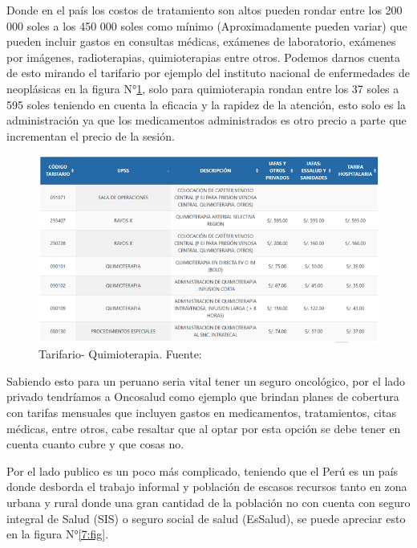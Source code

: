 Donde en el país los costos de tratamiento son altos pueden rondar entre los 200 000 soles a los 450 000 soles como mínimo (Aproximadamente pueden variar) que pueden incluir gastos en consultas médicas, exámenes de laboratorio, exámenes por imágenes, radioterapias, quimioterapias entre otros. Podemos darnos cuenta de esto mirando el tarifario por ejemplo del instituto nacional de enfermedades de neoplásicas en la figura N°\ref{6:fig}, solo para quimioterapia rondan entre los 37 soles a 595 soles teniendo en cuenta la eficacia y la rapidez de la atención, esto solo es la administración ya que los medicamentos administrados es otro precio a parte que incrementan el precio de la sesión.

\begin{figure}[ht]
	\centering
	\includegraphics[width=1.1\textwidth]{1/figures/Tarifario.png}
	\caption{Tarifario- Quimioterapia. Fuente: \cite{inenTarifario}}
	\label{6:fig}
\end{figure}
\vspace{0.5 cm}

Sabiendo esto para un peruano seria vital tener un seguro oncológico, por el lado privado tendríamos a Oncosalud como ejemplo que brindan planes de cobertura con tarifas mensuales que incluyen gastos en medicamentos, tratamientos, citas médicas, entre otros, cabe resaltar que al optar por esta opción se debe tener en cuenta cuanto cubre y que cosas no.

Por el lado publico es un poco más complicado, teniendo que el Perú es un país donde desborda el trabajo informal y población de escasos recursos tanto en zona urbana y rural donde una gran cantidad de la población no con cuenta con seguro integral de Salud (SIS) o seguro social de salud (EsSalud), se puede apreciar esto en la figura N°\ref{7:fig}.

